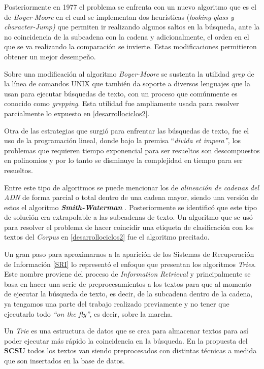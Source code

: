 \documentclass[
  10,
  openany]{book}
\begin{document}
Posteriormente en 1977 el problema se enfrenta con un nuevo algoritmo que es el de \emph{Boyer-Moore} en el cual se implementan dos heurísticas (\emph{looking-glass y} \emph{character-Jump)} que permiten ir realizando algunos saltos en la búsqueda, ante la no coincidencia de la subcadena con la cadena y adicionalmente, el orden en el que se va realizando la comparación se invierte. Estas modificaciones permitieron obtener un mejor desempeño.

Sobre una modificación al algoritmo \emph{Boyer-Moore} se sustenta la utilidad \emph{grep} de la línea de comandos UNIX que también da soporte a diversos lenguajes que la usan para ejecutar búsquedas de texto, con un proceso que comúnmente es conocido como \emph{grepping}. Esta utilidad fue ampliamente usada para resolver parcialmente lo expuesto en \ref{desarrollociclos2}.

Otra de las estrategias que surgió para enfrentar las búsquedas de texto, fue el uso de la programación lineal, donde bajo la premisa ``\emph{divida et impera'',} los problemas que requieren tiempo exponencial para ser resueltos son descompuestos en polinomios y por lo tanto se disminuye la complejidad en tiempo para ser resueltos.

Entre este tipo de algoritmos se puede mencionar los de \emph{alineación de cadenas del ADN} de forma parcial o total dentro de una cadena mayor, siendo una versión de estos el algoritmo \textbf{\emph{Smith-Waterman}} \citep{smith1981}. Posteriormente se identificó que este tipo de solución era extrapolable a las subcadenas de texto. Un algoritmo que se usó para resolver el problema de hacer coincidir una etiqueta de clasificación con los textos del \emph{Corpus} en \ref{desarrollociclos2} fue el algoritmo precitado.

Un gran paso para aproximarnos a la aparición de los Sistemas de Recuperación de Información \ref{SRI} lo representó el enfoque que presentan los algoritmos \emph{Tries}. Este nombre proviene del proceso de \emph{Information Retrieval} y principalmente se basa en hacer una serie de preprocesamientos a los textos para que al momento de ejecutar la búsqueda de texto, es decir, de la subcadena dentro de la cadena, ya tengamos una parte del trabajo realizado previamente y no tener que ejecutarlo todo \emph{``on the fly''}, es decir, sobre la marcha.

Un \emph{Trie} \citep{fredkin1960} es una estructura de datos que se crea para almacenar textos para así poder ejecutar más rápido la coincidencia en la búsqueda. En la propuesta del \textbf{SCSU} todos los textos van siendo preprocesados con distintas técnicas a medida que son insertados en la base de datos.
\end{document}
